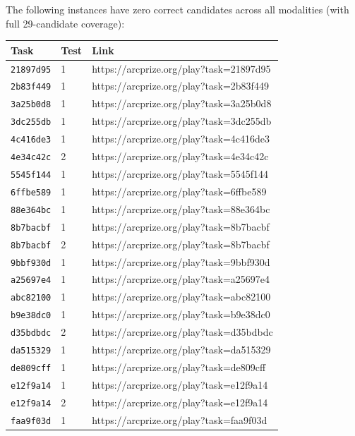 \documentclass[10pt]{article}
\begin{document}
The following instances have zero correct candidates across all
modalities (with full 29-candidate coverage):

\begin{longtable}[]{@{}lll@{}}
\toprule\noalign{}
Task & Test & Link \\
\midrule\noalign{}
\endhead
\bottomrule\noalign{}
\endlastfoot
\texttt{21897d95} & 1 & https://arcprize.org/play?task=21897d95 \\
\texttt{2b83f449} & 1 & https://arcprize.org/play?task=2b83f449 \\
\texttt{3a25b0d8} & 1 & https://arcprize.org/play?task=3a25b0d8 \\
\texttt{3dc255db} & 1 & https://arcprize.org/play?task=3dc255db \\
\texttt{4c416de3} & 1 & https://arcprize.org/play?task=4c416de3 \\
\texttt{4e34c42c} & 2 & https://arcprize.org/play?task=4e34c42c \\
\texttt{5545f144} & 1 & https://arcprize.org/play?task=5545f144 \\
\texttt{6ffbe589} & 1 & https://arcprize.org/play?task=6ffbe589 \\
\texttt{88e364bc} & 1 & https://arcprize.org/play?task=88e364bc \\
\texttt{8b7bacbf} & 1 & https://arcprize.org/play?task=8b7bacbf \\
\texttt{8b7bacbf} & 2 & https://arcprize.org/play?task=8b7bacbf \\
\texttt{9bbf930d} & 1 & https://arcprize.org/play?task=9bbf930d \\
\texttt{a25697e4} & 1 & https://arcprize.org/play?task=a25697e4 \\
\texttt{abc82100} & 1 & https://arcprize.org/play?task=abc82100 \\
\texttt{b9e38dc0} & 1 & https://arcprize.org/play?task=b9e38dc0 \\
\texttt{d35bdbdc} & 2 & https://arcprize.org/play?task=d35bdbdc \\
\texttt{da515329} & 1 & https://arcprize.org/play?task=da515329 \\
\texttt{de809cff} & 1 & https://arcprize.org/play?task=de809cff \\
\texttt{e12f9a14} & 1 & https://arcprize.org/play?task=e12f9a14 \\
\texttt{e12f9a14} & 2 & https://arcprize.org/play?task=e12f9a14 \\
\texttt{faa9f03d} & 1 & https://arcprize.org/play?task=faa9f03d \\
\end{longtable}
\end{document}
